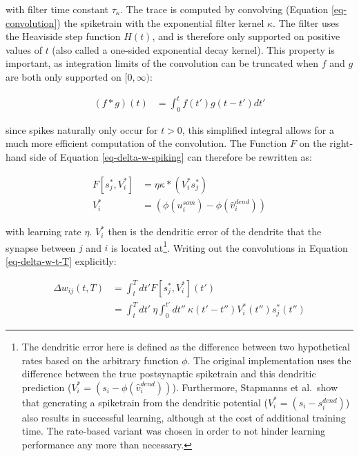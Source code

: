 with filter time constant $\tau_\kappa$. The trace is computed by convolving (Equation \ref{eq-convolution}) the
spiketrain with the exponential filter kernel $\kappa$. The filter uses the Heaviside step function $H(t)$, and is
therefore only supported on positive values of $t$ (also called a one-sided exponential decay kernel). This property is
important, as integration limits of the convolution can be truncated when $f$ and $g$ are both only supported on
$[0,\infty)$:

\begin{align}
  (f \ast g)(t) & = \int_{0}^{t} f(t') g(t-t') d t'
\end{align}

since spikes naturally only occur for $t>0$, this simplified integral allows for a much more efficient computation of
the convolution. The Function $F$ on the right-hand side of Equation \ref{eq-delta-w-spiking} can therefore be rewritten
as:

\begin{align}
  F[s_j^\ast, V_i^\ast] & = \eta \kappa \ast (V_i^\ast s_j^\ast)        \\
  V_i^\ast              & = (\phi(u_i^{som}) - \phi(\hat{v}_i^{dend}) )
\end{align}

with learning rate $\eta$. $V_i^\ast$ then is the dendritic error of the dendrite that the synapse between $j$ and $i$
is located at\footnote{The dendritic error here is defined as the difference between two hypothetical rates based on the
arbitrary function $\phi$. The original implementation uses the difference between the true postsynaptic spiketrain and
this dendritic prediction ($V_i^\ast = (s_i - \phi(\hat{v}_i^{dend}) )$). Furthermore, Stapmanns et al.\ show that
generating a spiketrain from the dendritic potential ($V_i^\ast = (s_i - s_i^{dend})$) also results in successful
learning, although at the cost of additional training time. The rate-based variant was chosen in order to not hinder
learning performance any more than necessary.}. Writing out the convolutions in Equation \ref{eq-delta-w-t-T}
explicitly:

\begin{align}
  \Delta w_{ij}(t,T) & = \int_t^T dt' F[s_j^\ast, V_i^\ast](t')                                                                           \\
                     & =  \int_t^T dt' \  \eta\int_0^{t'} dt'' \ \kappa(t'-t'') V_i^\ast (t'') s_j^\ast (t'') \label{eq-delta-w-t-T-long}
\end{align}

